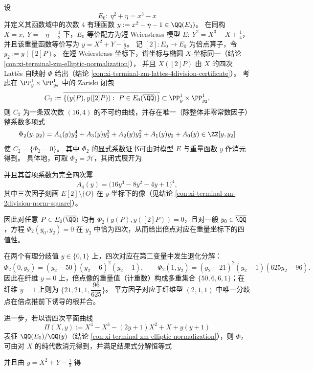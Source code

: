 \begin{conclusion}\label{con:xi-terminal-zm-elliptic-weight-doubling-modular-equation}
设
\[
E_0:\ \eta^{2}+\eta=x^{3}-x
\]
并定义其函数域中的次数 \(4\) 有理函数
\(
y:=x^{2}-\eta-1\in\QQ(E_0)
\)。
在同构
\(
X=x,\ Y=-\eta-\tfrac12
\)
下，\(E_0\) 等价配方为短 Weierstrass 模型
\(
E:\ Y^{2}=X^{3}-X+\tfrac14
\)，并且该重量函数等价写为 \(y=X^{2}+Y-\tfrac12\)。
记 \([2]:E_0\to E_0\) 为倍点算子，令 \(y_{2}:=y([2]P)\)。
在短 Weierstrass 坐标下，谱坐标与椭圆 \(X\)-坐标同一（结论 \ref{con:xi-terminal-zm-elliptic-normalization}），
并且 \(X([2]P)\) 由 \(X\) 的四次 Latt\`es 自映射 \(\Phi\) 给出（结论 \ref{con:xi-terminal-zm-lattes-4division-certificate}）。
考虑在 \(\PP^{1}_{y}\times \PP^{1}_{y_{2}}\) 中的 Zariski 闭包
\[
C_{2}:=\overline{\{(y(P),y([2]P)):\ P\in E_0(\overline{\QQ})\}}\subset \PP^{1}_{y}\times \PP^{1}_{y_{2}}.
\]
则 \(C_{2}\) 为一条双次数 \((16,4)\) 的不可约曲线，并存在唯一（除整体非零常数因子）整系数多项式
\[
\Phi_{2}(y,y_{2})=A_{4}(y)y_{2}^{4}+A_{3}(y)y_{2}^{3}+A_{2}(y)y_{2}^{2}+A_{1}(y)y_{2}+A_{0}(y)\in\ZZ[y,y_{2}]
\]
使 \(C_{2}=\{\Phi_{2}=0\}\)。
其中 \(\Phi_{2}\) 的显式系数证书可由对模型 \(E\) 与重量函数 \(y\) 作消元得到。
具体地，可取 \(\Phi_{2}=\mathcal H\)，其闭式展开为

并且其首项系数为完全四次幂
\[
A_{4}(y)=\bigl(16y^{3}-8y^{2}-4y+1\bigr)^{4},
\]
其中三次因子刻画 \(E[2]\setminus\{O\}\) 在 \(y\)-坐标下的像（见结论 \ref{con:xi-terminal-zm-2division-norm-square}）。
\par
因此对任意 \(P\in E_0(\overline{\QQ})\) 均有 \(\Phi_{2}(y(P),y([2]P))=0\)，且对一般 \(y_{0}\in\overline{\QQ}\)，方程 \(\Phi_{2}(y_{0},y_{2})=0\) 在 \(y_{2}\) 中恰为四次，从而给出倍点对应在重量坐标下的四值性。
\par
在两个有理分歧值 \(y\in\{0,1\}\) 上，四次对应在第二变量中发生退化分解：
\[
\Phi_{2}(0,y_{2})=(y_{2}-50)(y_{2}-6)^{2}(y_{2}-1),\qquad
\Phi_{2}(1,y_{2})=(y_{2}-21)^{2}(y_{2}-1)(625y_{2}-96).
\]
因此在纤维 \(y=0\) 上，倍点像的重量值（计重数）构成多重集合 \(\{50,6,6,1\}\)；在纤维 \(y=1\) 上则为 \(\{21,21,1,\dfrac{96}{625}\}\)。
平方因子对应于纤维型 \((2,1,1)\) 中唯一分歧点在倍点推前下诱导的根并合。
\par
进一步，若以谱四次平面曲线
\[
\Pi(X,y):=X^{4}-X^{3}-(2y+1)X^{2}+X+y(y+1)
\]
表征 \(\QQ(E_0)/\QQ(y)\)（结论 \ref{con:xi-terminal-zm-elliptic-normalization}），则 \(\Phi_{2}\) 可由对 \(X\) 的纯代数消元得到，并满足结果式分解恒等式
\par
并且由 \(y=X^{2}+Y-\tfrac12\) 得

\end{conclusion}
